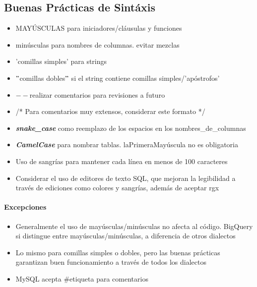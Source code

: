 \subsection{Buenas Prácticas de Sintáxis}
\begin{itemize}
    \item {MAYÚSCULAS para iniciadores/cláusulas y funciones}
    \item {minúsculas para nombres de columnas. evitar mezclas}
    \item {'comillas simples' para strings}
    \item {${"}$comillas dobles${"}$ si el string contiene comillas simples/'apóstrofos'}
    \item {${--}$realizar comentarios para revisiones a futuro}
    \item{/* Para comentarios muy extensos, considerar este formato */}
    \item {\textbf{\textit{snake\_case}} como reemplazo de los espacios en los nombres\_de\_columnas}
    \item {\textbf{\textit{CamelCase}} para nombrar tablas. laPrimeraMayúscula no es obligatoria}
    \item {Uso de sangrías para mantener cada línea en menos de 100 caracteres}
    \item {Considerar el uso de editores de texto SQL, que mejoran la legibilidad a través de ediciones como colores y sangrías, además de aceptar \gls{rgx}}
\end{itemize}

\paragraph{Excepciones}
\begin{itemize}
    \item {Generalmente el uso de mayúsculas/minúsculas no afecta al código. BigQuery si distingue entre mayúsculas/minúsculas, a diferencia de otros dialectos}
    \item {Lo mismo para comillas simples o dobles, pero las buenas prácticas garantizan buen funcionamiento a través de todos los dialectos}
    \item {MySQL acepta \#etiqueta para comentarios}
\end{itemize}